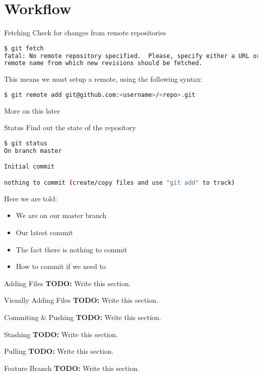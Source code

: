 \documentclass{beamer}
\begin{document}
  \section{Workflow}
  \begin{frame}[fragile=singleslide]{Fetching}
    Check for changes from remote repositories
    \begin{lstlisting}[language=bash]
$ git fetch
fatal: No remote repository specified.  Please, specify either a URL or a
remote name from which new revisions should be fetched.
    \end{lstlisting}
    This means we must setup a remote, using the following syntax:
    \begin{lstlisting}[language=bash]
$ git remote add git@github.com:<username>/<repo>.git
    \end{lstlisting}
    More on this later
  \end{frame}
  \begin{frame}[fragile=singleslide]{Status}
    Find out the state of the repository
    \begin{lstlisting}[language=bash]
$ git status
On branch master

Initial commit

nothing to commit (create/copy files and use "git add" to track)
    \end{lstlisting}
    Here we are told:
    \begin{itemize}
      \item We are on our master branch
      \item Our latest commit
      \item The fact there is nothing to commit
      \item How to commit if we need to
    \end{itemize}
  \end{frame}
  \begin{frame}{Adding Files}
    \textbf{TODO:} Write this section.
  \end{frame}
  \begin{frame}{Visually Adding Files}
    \textbf{TODO:} Write this section.
  \end{frame}
  \begin{frame}{Commiting \& Pushing}
    \textbf{TODO:} Write this section.
  \end{frame}
  \begin{frame}{Stashing}
    \textbf{TODO:} Write this section.
  \end{frame}
  \begin{frame}{Pulling}
    \textbf{TODO:} Write this section.
  \end{frame}
  \begin{frame}{Feature Branch}
    \textbf{TODO:} Write this section.
  \end{frame}
\end{document}
